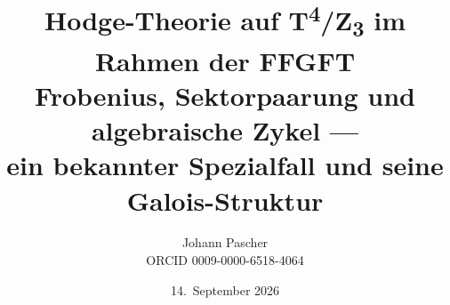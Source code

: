 \documentclass[11pt,a4paper]{report}
\title{Hodge-Theorie auf T\textsuperscript{4}/Z\textsubscript{3} im Rahmen der FFGFT\\[0.5em]
  \large Frobenius, Sektorpaarung und algebraische Zykel ---\\ ein bekannter Spezialfall und seine Galois-Struktur}
\date{14.~September 2026}
\author{Johann Pascher\\\small ORCID 0009-0000-6518-4064}
\begin{document}
\renewcommand{\thechapter}{}
\renewcommand{\thesection}{\arabic{section}}
\maketitle
\tableofcontents

\end{document}
